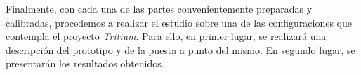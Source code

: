 Finalmente, con cada una de las partes convenientemente preparadas y calibradas, procedemos a realizar el estudio sobre una de las configuraciones que contempla el proyecto \textit{Tritium}. Para ello, en primer lugar, se realizará una descripción del prototipo y de la puesta a punto del mismo. En segundo lugar, se presentarán los resultados obtenidos.